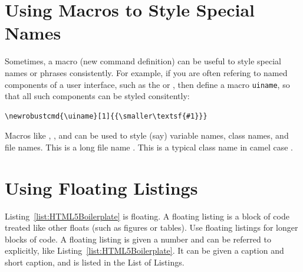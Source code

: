 \section{Using Macros to Style Special Names}

Sometimes, a macro (new command definition) can be useful to style
special names or phrases consistently. For example, if you are often
refering to named components of a user interface, such as the
 or , then define a macro
\verb|uiname|, so that all such components can be styled consitently:
\begin{lstlisting}
\newrobustcmd{\uiname}[1]{{\smaller\textsf{#1}}}
\end{lstlisting}

Macros like , , and  can be
used to style (say) variable names, class names, and file names. This
is a long file name
. This is a typical
class name in camel case .





\section{Using Floating Listings}

Listing~\ref{list:HTML5Boilerplate} is floating. A floating listing is
a block of code treated like other \LaTeXe floats (such as figures or
tables). Use floating listings for longer blocks of code.
A floating listing is given a number and can be referred to
explicitly, like Listing~\ref{list:HTML5Boilerplate}. It can be given
a caption and short caption, and is listed in the List of Listings.


